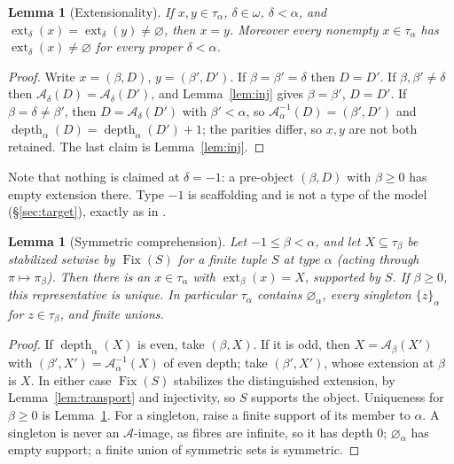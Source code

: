\documentclass[11pt]{article}
\newtheorem{lemma}[theorem]{Lemma}
\theoremstyle{definition}
\theoremstyle{remark}
\newcommand{\Fix}{\operatorname{Fix}}
\newcommand{\ext}{\operatorname{ext}}
\newcommand{\dep}{\operatorname{depth}}
\newcommand{\calA}{\mathcal A}
\begin{document}
\begin{lemma}[Extensionality]\label{lem:ext}
If \(x,y\in\tau_\alpha\), \(\delta\in\omega\), \(\delta<\alpha\), and
\(\ext_\delta(x)=\ext_\delta(y)\neq\varnothing\), then \(x=y\). Moreover
every nonempty \(x\in\tau_\alpha\) has \(\ext_\delta(x)\neq\varnothing\)
for every proper \(\delta<\alpha\).
\end{lemma}
\begin{proof}
Write \(x=(\beta,D)\), \(y=(\beta',D')\). If \(\beta=\beta'=\delta\) then
\(D=D'\). If \(\beta,\beta'\neq\delta\) then \(\calA_\delta(D)=\calA_\delta
(D')\), and Lemma~\ref{lem:inj} gives \(\beta=\beta'\), \(D=D'\). If
\(\beta=\delta\neq\beta'\), then \(D=\calA_\delta(D')\) with \(\beta'<
\alpha\), so \(\calA^{-1}_\alpha(D)=(\beta',D')\) and \(\dep_\alpha(D)=
\dep_\alpha(D')+1\); the parities differ, so \(x,y\) are not both
retained. The last claim is Lemma~\ref{lem:inj}.
\end{proof}

Note that nothing is claimed at \(\delta=-1\): a pre-object \((\beta,D)\)
with \(\beta\geq0\) has empty extension there. Type \(-1\) is scaffolding
and is not a type of the model (\S\ref{sec:target}), exactly as in
\cite{HW}.

\begin{lemma}[Symmetric comprehension]\label{lem:symm}
Let \(-1\leq\beta<\alpha\), and let \(X\subseteq\tau_\beta\) be stabilized
setwise by \(\Fix(S)\) for a finite tuple \(S\) at type \(\alpha\) (acting
through \(\pi\mapsto\pi_\beta\)). Then there is an \(x\in\tau_\alpha\)
with \(\ext_\beta(x)=X\), supported by \(S\). If \(\beta\geq0\), this
representative is unique. In
particular \(\tau_\alpha\) contains \(\varnothing_\alpha\), every
singleton \(\{z\}_\alpha\) for \(z\in\tau_\beta\), and finite unions.
\end{lemma}
\begin{proof}
If \(\dep_\alpha(X)\) is even, take \((\beta,X)\). If it is odd, then
\(X=\calA_\beta(X')\) with \((\beta',X')=\calA^{-1}_\alpha(X)\) of even
depth; take \((\beta',X')\), whose extension at \(\beta\) is \(X\). In
either case \(\Fix(S)\) stabilizes the distinguished extension, by
Lemma~\ref{lem:transport} and injectivity, so \(S\) supports the object.
Uniqueness for \(\beta\geq0\) is Lemma~\ref{lem:ext}. For a singleton,
raise a finite support of its member to \(\alpha\). A singleton is never
an \(\calA\)-image, as fibres are infinite, so it has depth \(0\);
\(\varnothing_\alpha\) has empty support; a finite union of symmetric sets
is symmetric.
\end{proof}
\end{document}
